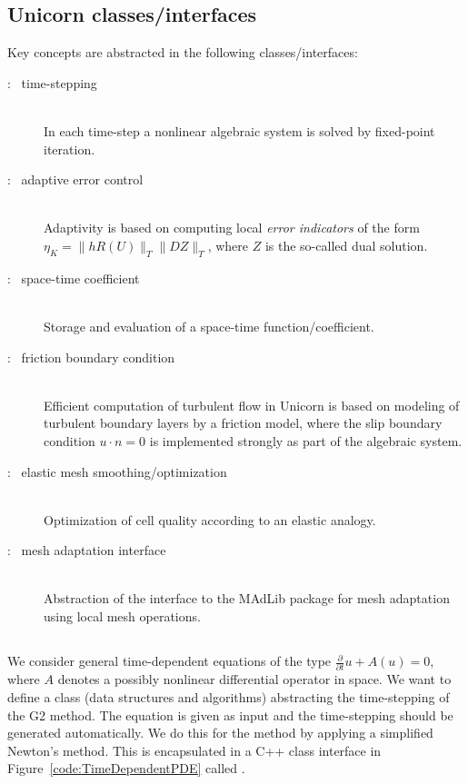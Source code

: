 \subsection{Unicorn classes/interfaces}

Key concepts are abstracted in the following classes/interfaces:
\begin{description}
\item[: \ time-stepping]
\ \\
In each time-step a nonlinear algebraic system is solved by
fixed-point iteration.
\item[: \ adaptive error control] \ \\ Adaptivity
  is based on computing local {\em error indicators} of the
  form $\eta_K = \|h R(U)\|_T \|D Z\|_T$, where $Z$ is the so-called
  dual solution.

\item[: \ space-time coefficient]
\ \\
Storage and evaluation of a space-time function/coefficient.
\item[: \ friction boundary condition] \ \\ Efficient
  computation of turbulent flow in Unicorn is based on modeling of
  turbulent boundary layers by a friction model, where the slip
  boundary condition $u \cdot n = 0$ is implemented strongly as part
  of the algebraic system.
\item[: \ elastic mesh smoothing/optimization]
\ \\
Optimization of cell quality according to an elastic analogy.
\item[: \ mesh adaptation interface]
\ \\
Abstraction of the interface to the MAdLib package for mesh adaptation
using local mesh operations.
\end{description}

\subsection{}

We consider general time-dependent equations of the type
$\frac{\partial}{\partial t} u + A(u) = 0$, where $A$ denotes a
possibly nonlinear differential operator in space. We want to define a
class (data structures and algorithms) abstracting the time-stepping
of the G2 method. The equation is given as input and the time-stepping
should be generated automatically. We do this for the \cgone{}\cgone{}
method by applying a simplified Newton's method. This is encapsulated
in a C++ class interface in
Figure~\ref{code:TimeDependentPDE} called .


